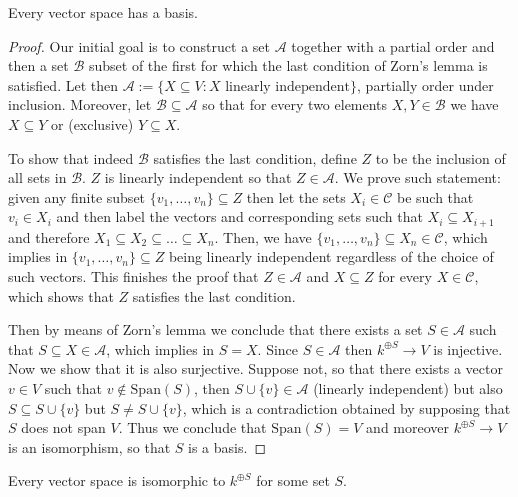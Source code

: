 \begin{theorem}
  Every vector space has a basis.
\end{theorem}

\begin{proof}
  Our initial goal is to construct a set \(\mathcal A\) together with a partial
  order and then a set \(\mathcal B\) subset of the first for which the last
  condition of Zorn's lemma is satisfied. Let then \(\mathcal A := \{X \subseteq
  V : X \text{ linearly independent}\}\), partially order under inclusion.
  Moreover, let \(\mathcal B \subseteq \mathcal A\) so that for every two
  elements \(X, Y \in \mathcal B\) we have \(X \subseteq Y\) or (exclusive) \(Y
  \subseteq X\).

  To show that indeed \(\mathcal B\) satisfies the last condition, define \(Z\)
  to be the inclusion of all sets in \(\mathcal B\). \(Z\) is linearly
  independent so that \(Z \in \mathcal A\). We prove such statement: given any
  finite subset \(\{v_1, \dots, v_n\} \subseteq Z\) then let the sets \(X_i \in
  \mathcal C\) be such that \(v_i \in X_i\) and then label the vectors and
  corresponding sets such that \(X_i \subseteq X_{i+1}\) and therefore \(X_1
  \subseteq  X_2 \subseteq  \dots \subseteq X_n\). Then, we have \(\{v_1, \dots,
  v_n\} \subseteq X_n \in \mathcal C\), which implies in \(\{v_1, \dots, v_n\}
  \subseteq Z\) being linearly independent regardless of the choice of such
  vectors. This finishes the proof that \(Z \in \mathcal A\) and \(X \subseteq
  Z\) for every \(X \in \mathcal C\), which shows that \(Z\) satisfies the last
  condition.

  Then by means of Zorn's lemma we conclude that there exists a set \(S \in
  \mathcal A\) such that \(S \subseteq X \in \mathcal A\), which implies in \(S
  = X\).  Since \(S \in \mathcal A\) then \(k^{\oplus S} \to V\) is injective.
  Now we show that it is also surjective. Suppose not, so that there exists a
  vector \(v \in V\) such that \(v \not\in \mathrm{Span}(S)\), then \(S \cup
  \{v\} \in \mathcal A\) (linearly independent) but also \(S \subseteq S \cup
  \{v\}\) but \(S \neq S \cup \{v\}\), which is a contradiction obtained by
  supposing that \(S\) does not span \(V\). Thus we conclude that
  \(\mathrm{Span}(S) = V\) and moreover \(k^{\oplus S} \to V\) is an
  isomorphism, so that \(S\) is a basis.
\end{proof}

\begin{corollary}
  Every vector space is isomorphic to \(k^{\oplus S}\) for some set \(S\).
\end{corollary}

